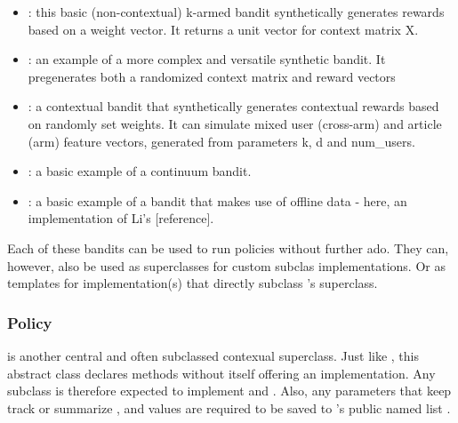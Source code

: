 \documentclass{jss}\usepackage[]{graphicx}\usepackage[]{color}
\begin{document}
\begin{itemize}
         \item {}: this basic (non-contextual) k-armed bandit synthetically generates rewards based on a weight vector. It returns a unit vector for context matrix X.
                  \item {}: an example of a more complex and versatile synthetic bandit. It pregenerates both a randomized context matrix and reward vectors
         \item {}: a contextual bandit that synthetically generates contextual rewards based on randomly set weights. It can simulate mixed user (cross-arm) and article (arm) feature vectors, generated from parameters k, d and num\_users.
         \item {}: a basic example of a continuum bandit.
         \item {}: a basic example of a bandit that makes use of offline data - here, an implementation of Li's [reference].
\end{itemize}

Each of these bandits can be used to run policies without further ado. They can, however, also be used as superclasses for custom  subclas implementations. Or as templates for  implementation(s) that directly subclass 's  superclass.

\subsubsection{Policy}

 is another central and often subclassed contexual superclass. Just like , this abstract class declares methods without itself offering an implementation. Any  subclass is therefore expected to implement  and . Also, any parameters that keep track or summarize ,  and  values are required to be saved to 's public named list .
\end{document}
